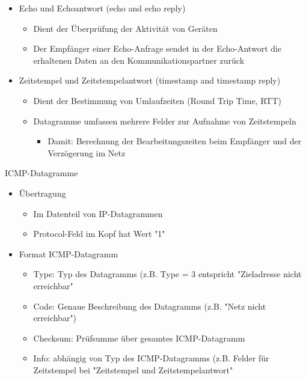       \begin{itemize}
        \item Echo und Echoantwort (echo and echo reply)
          \begin{itemize}
            \item Dient der Überprüfung der Aktivität von Geräten
            \item Der Empfänger einer Echo-Anfrage sendet in der Echo-Antwort die erhaltenen Daten an
              den Kommunikationspartner zurück
          \end{itemize}
        \item Zeitstempel und Zeitstempelantwort (timestamp and timestamp reply)
          \begin{itemize}
            \item Dient der Bestimmung von Umlaufzeiten (Round Trip Time, RTT)
            \item Datagramme umfassen mehrere Felder zur Aufnahme von Zeitstempeln
              \begin{itemize}
                \item Damit: Berechnung der Bearbeitungszeiten beim Empfänger und der Verzögerung im
                  Netz
              \end{itemize}
          \end{itemize}
      \end{itemize}
      ICMP-Datagramme
      \begin{itemize}
        \item Übertragung
          \begin{itemize}
            \item Im Datenteil von IP-Datagrammen
            \item Protocol-Feld im Kopf hat Wert "1"
          \end{itemize}
        \item Format ICMP-Datagramm
          \begin{itemize}
            \item Type: Typ des Datagramms (z.B. Type = 3 entspricht "Zieladresse nicht erreichbar"
            \item Code: Genaue Beschreibung des Datagramms (z.B. "Netz nicht erreichbar")
            \item Checksum: Prüfsumme über gesamtes ICMP-Datagramm
            \item Info: abhängig von Typ des ICMP-Datagramms (z.B. Felder für Zeitstempel bei
              "Zeitstempel und Zeitstempelantwort"
          \end{itemize}
      \end{itemize}
